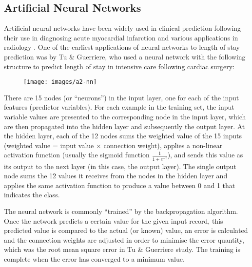 \subsection{Artificial Neural Networks}
Artificial neural networks have been widely used in clinical prediction
following their use in diagnosing acute myocardial infarction and various
applications in radiology \citep{Baxt1995}.
One of the earliest applications of neural networks to
length of stay prediction was by Tu \& Guerriere, who used a neural network
with the following structure \citep{Tu1993} to predict length of stay in
intensive care following cardiac surgery:
\begin{figure}[h]
\caption{}
\centering
\texttt{[image: images/a2-nn]}
\end{figure}

There are 15 nodes (or ``neurons'') in the input layer, one for each of the
input features (predictor variables). For each example in the training set,
the input variable values are presented to the corresponding node in the input
layer, which are then propagated into the hidden layer and subsequently the
output layer. At the hidden layer, each of the 12 nodes sums the weighted
value of the 15 inputs (weighted value = input value $\times$ connection
weight), applies a non-linear activation function (usually the sigmoid function
$\frac{1}{1+e^{-t}}$), and sends this value as its output to the next layer
(in this case, the output layer). The single output node sums the 12 values
it receives from the nodes in the hidden layer and applies the same activation
function to produce a value between 0 and 1 that indicates the class.

The neural network is commonly ``trained'' by the backpropagation algorithm.
Once the network predicts a certain value for the given input record, this
predicted value is compared to the actual (or known) value, an error is
calculated and the connection weights are adjusted in order to minimise the
error quantity, which was the root mean square error in Tu \& Guerriere study.
The training is complete when the error has converged to a minimum value.

